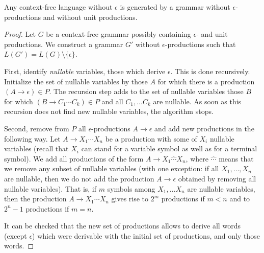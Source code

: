 \begin{page}
\setcounter{section}{5}
\setcounter{subsection}{2}
\setcounter{dfn}{8}
\label{portion:1232}

\begin{lem}
\label{lem:NoENoUnit}
Any context-free language without $\epsilon$ is generated by a grammar without $\epsilon$-productions and without unit productions.
\end{lem}

\end{page}

\begin{page}
\setcounter{section}{5}
\setcounter{subsection}{2}
\setcounter{dfn}{8}
\label{portion:1233}

\begin{proof}
Let $G$ be a context-free grammar possibly containing $\epsilon$- and unit productions.
We construct a grammar $G'$ without $\epsilon$-productions such that $L(G') = L(G) \setminus \{\epsilon\}$.

First, identify \emph{nullable} variables, those which derive $\epsilon$.
This is done recursively.
Initialize the set of nullable variables by those $A$ for which there is a production $(A \to \epsilon) \in P$.
The recursion step adds to the set of nullable variables those $B$ for which $(B \to C_1 \cdots C_k) \in P$
and all $C_1, \ldots C_k$ are nullable.
As soon as this recursion does not find new nullable variables, the algorithm stops.

Second, remove from $P$ all $\epsilon$-productions $A \to \epsilon$ and add new productions in the following way.
Let $A \to X_1 \cdots X_n$ be a production with some of $X_i$ nullable variables
(recall that $X_i$ can stand for a variable symbol as well as for a terminal symbol).
We add all productions of the form $A \to X_1 \widehat{\cdots} X_n$,
where $\widehat{\cdots}$ means that we remove any subset of nullable variables
(with one exception: if all $X_1, \ldots, X_n$ are nullable,
then we do not add the production $A \to \epsilon$ obtained by removing all nullable variables).
That is, if $m$ symbols among $X_1, \ldots X_n$ are nullable variables, then the production $A \to X_1 \cdots X_n$
gives rise to $2^m$ productions if $m < n$ and to $2^n - 1$ productions if $m=n$.

It can be checked that the new set of productions allows to derive all words (except $\epsilon$) which were derivable
with the initial set of productions, and only those words.


\end{proof}
\end{page}
